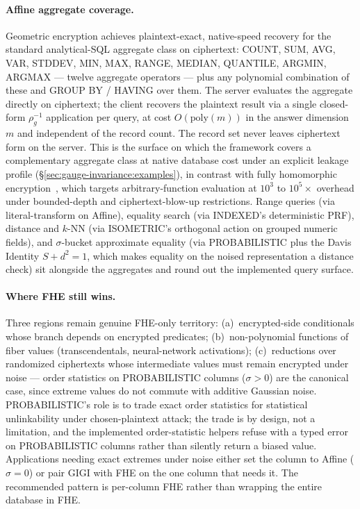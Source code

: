 \documentclass[11pt,letterpaper]{article}
\begin{document}
\paragraph{Affine aggregate coverage.}
Geometric encryption achieves plaintext-exact, native-speed
recovery for the standard analytical-SQL aggregate class on
ciphertext: COUNT, SUM, AVG, VAR, STDDEV, MIN, MAX, RANGE, MEDIAN,
QUANTILE, ARGMIN, ARGMAX --- twelve aggregate operators --- plus
any polynomial combination of these and GROUP BY / HAVING over
them. The server evaluates the aggregate directly on ciphertext;
the client recovers the plaintext result via a single closed-form
$\rho_g^{-1}$ application per query, at cost $O(\mathrm{poly}(m))$
in the answer dimension $m$ and independent of the record count.
The record set never leaves ciphertext form on the server. This is
the surface on which the framework covers a complementary
aggregate class at native database cost under an explicit
leakage profile (\S\ref{sec:gauge-invariance:examples}), in
contrast with fully homomorphic
encryption~\cite{gentry2009fhe,bgv2012,ckks2017}, which targets
arbitrary-function evaluation at $10^3$ to $10^5\times$ overhead
under bounded-depth and ciphertext-blow-up restrictions. Range queries (via
literal-transform on Affine), equality search (via INDEXED's
deterministic PRF), distance and $k$-NN (via ISOMETRIC's
orthogonal action on grouped numeric fields), and $\sigma$-bucket
approximate equality (via PROBABILISTIC plus the Davis Identity
$S + d^2 = 1$, which makes equality on the noised representation
a distance check) sit alongside the aggregates and round out the
implemented query surface.

\paragraph{Where FHE still wins.}
Three regions remain genuine FHE-only territory:
(a)~encrypted-side conditionals whose branch depends on encrypted
predicates; (b)~non-polynomial functions of fiber values
(transcendentals, neural-network activations);
(c)~reductions over randomized ciphertexts whose intermediate
values must remain encrypted under noise --- order statistics on
PROBABILISTIC columns ($\sigma > 0$) are the canonical case, since
extreme values do not commute with additive Gaussian noise.
PROBABILISTIC's role is to trade exact order statistics for
statistical unlinkability under chosen-plaintext attack; the trade
is by design, not a limitation, and the implemented
order-statistic helpers refuse with a typed error on PROBABILISTIC columns rather
than silently return a biased value. Applications needing exact
extremes under noise either set the column to Affine ($\sigma = 0$)
or pair GIGI with FHE on the one column that needs it. The
recommended pattern is per-column FHE rather than wrapping the
entire database in FHE.
\end{document}
